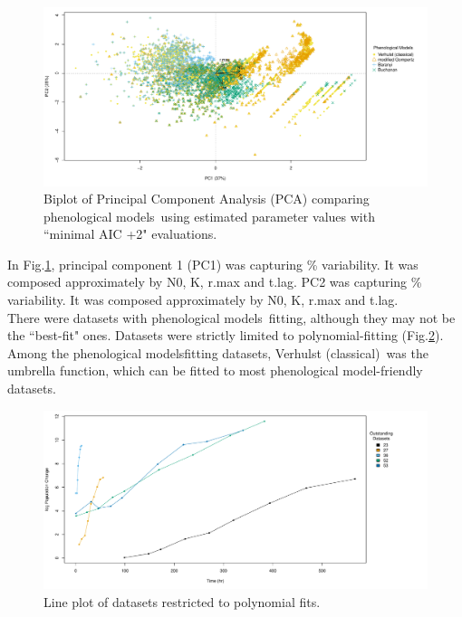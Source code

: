 \documentclass[a4paper, 11pt]{article}
\newcommand{\pml}{phenological model}
\newcommand{\pms}{phenological models}
\newcommand{\fve}{Verhulst (classical)}
\newcommand{\fgo}{modified Gompertz}
\newcommand{\fba}{Baranyi}
\newcommand{\fbu}{Buchanan}
\begin{document}
	 \begin{figure}[h]
	 	\centering
	 	\includegraphics[width=\linewidth]{../results/Log_PCA.pdf}
	 	\caption{Biplot of Principal Component Analysis (PCA) comparing \pms\ using estimated parameter values with ``minimal AIC +2" evaluations.}\label{biptPCA}
	 \end{figure}
 In Fig.\ref{biptPCA}, principal component 1 (PC1) was capturing 
 \% variability.  It was composed approximately by 
  N0, 
  K, 
  r.max and 
  t.lag.  PC2 was capturing 
  \% variability.  It was composed approximately by 
  N0, 
  K, 
  r.max and 
  t.lag.\\
 
 There were 
  datasets with \pms\ fitting, although they may not be the ``best-fit" ones.  Datasets 
  were strictly limited to polynomial-fitting (Fig.\ref{lineOut}).  Among the \pms fitting datasets, \fve\ was the umbrella function, which can be fitted to most \pml-friendly datasets.\\
 \begin{figure}[h]
 	\centering
 	\includegraphics[width=\linewidth]{../results/Log_outstanding.pdf}
 	\caption{Line plot of datasets restricted to polynomial fits.}\label{lineOut}
 \end{figure}
	
\end{document}
